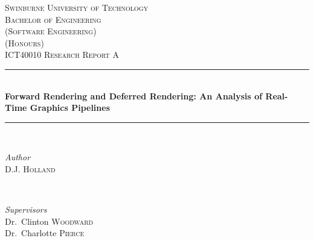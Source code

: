 \documentclass[11pt]{article}
\begin{document}


\begin{titlepage} %
  \newcommand{\HRule}{\rule{\linewidth}{0.5mm}} %

  \center{} %


  \textsc{\LARGE Swinburne University of Technology}\\[1.5cm]

  \textsc{
    \Large
    Bachelor of Engineering\\
    (Software Engineering)\\
    (Honours)
  }\\[0.5cm]

  \textsc{\large ICT40010 Research Report A}\\[0.5cm]


  \HRule{}\\[0.4cm]

  {\huge\bfseries Forward Rendering and Deferred Rendering: An Analysis of Real-Time Graphics Pipelines}\\[0.2cm]

  \HRule{}\\[1.5cm]


  \begin{minipage}{0.4\textwidth}
    \begin{flushleft}
      \large
      \textit{Author}\\
      D.J. \textsc{Holland}
    \end{flushleft}
  \end{minipage}
  {~}
  \begin{minipage}{0.4\textwidth}
    \begin{flushright}
      \large
      \textit{Supervisors}\\
      Dr.\ Clinton \textsc{Woodward}\\
      Dr.\ Charlotte \textsc{Pierce}
    \end{flushright}
  \end{minipage}


\end{titlepage}
\end{document}
